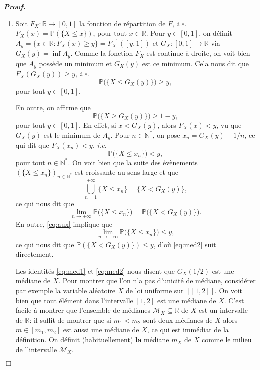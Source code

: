 \documentclass[11pt,a4paper]{article}
\newcommand{\NN}{\mathbb{N}}
\newcommand{\RR}{\mathbb{R}}
\newenvironment{preuve}[1][]
{\vskip 2mm  \noindent\emph{\bf Proof#1. }}{$\Box$ \vskip 2mm}
\let\geq\geqslant
\let\leq\leqslant
\begin{document}
		\begin{preuve}
			\begin{enumerate}
				\item Soit $F_{X} : \RR \rightarrow [0,1]$ la fonction de répartition de $F$, \textit{i.e.} $F_{X}(x) = \mathbb{P}(\{X \leq x\})$, pour tout $x \in \RR$. 
				Pour $y \in [0,1]$, on définit $A_{y} = \{ x \in \RR : F_{X}(x) \geq y \} = F_{X}^{-1}([y,1])$ et $G_{X} : [0,1] \rightarrow \RR$ 
				via $G_{X}(y) = \inf A_{y}$. 
				Comme la fonction $F_{X}$ est continue à droite, on voit bien que $A_{y}$ possède un minimum et $G_{X}(y)$ est ce minimum. 
				Cela nous dit que $F_{X}(G_{X}(y)) \geq y$, \textit{i.e.} 
				\begin{equation}
				\label{eq:med1}
				\mathbb{P}\big( \{ X \leq G_{X}(y) \} \big) \geq y,
				\end{equation}          
				pour tout $y \in [0,1]$. 
				
				En outre, on affirme que 
				\begin{equation}
				\label{eq:med2}
				\mathbb{P}\big( \{ X \geq G_{X}(y) \} \big) \geq 1-y,
				\end{equation}          
				pour tout $y \in [0,1]$. 
				En effet, si $x < G_{X}(y)$, alors $F_{X}(x) < y$, vu que $G_{X}(y)$ est le minimum de $A_{y}$. 
				Pour $n \in \NN^{*}$, on pose $x_{n} = G_{X}(y) - 1/n$, ce qui dit que $F_{X}(x_{n}) < y$, \textit{i.e.}
				\begin{equation}
				\label{eq:aux}
				\mathbb{P}\big( \{ X \leq x_{n} \} \big) < y,     
				\end{equation}   
				pour tout $n \in \NN^{*}$. 
				On voit bien que la suite des évènements $( \{ X \leq x_{n} \} )_{n \in \NN^{*}}$ est croissante au sens large et que
				\[     \bigcup_{n=1}^{+ \infty} \{ X \leq x_{n} \} = \{ X < G_{X}(y) \},     \]
				ce qui nous dit que 
				\[        \underset{n \rightarrow + \infty}{\lim} \mathbb{P}\big( \{ X \leq x_{n} \} \big) = \mathbb{P}\big( \{ X < G_{X}(y) \} \big).     \]
				En outre, \eqref{eq:aux} implique que  
				\[        \underset{n \rightarrow + \infty}{\lim} \mathbb{P}\big( \{ X \leq x_{n} \} \big) \leq y,     \]
				ce qui nous dit que $\mathbb{P}( \{ X < G_{X}(y) \}) \leq y$, d'où \eqref{eq:med2} suit directement. 
				
				Les identités \eqref{eq:med1} et \eqref{eq:med2} nous disent que $G_{X}(1/2)$ est une médiane de $X$. 
				Pour montrer que l'on n'a pas d'unicité de médiane, considérer par exemple la variable aléatoire $X$ de loi uniforme sur $[\![ 1, 2 ]\!]$. 
				On voit bien que tout élément dans l'intervalle $[1,2]$ est une médiane de $X$. 
				C'est facile à montrer que l'ensemble de médianes $\mathscr{M}_{X} \subseteq \RR$ de $X$ est un intervalle de $\RR$: 
				il suffit de montrer que si $m_{1} < m_{2}$ sont deux médianes de $X$ alors $m \in [m_{1},m_{2}]$ est aussi une médiane de $X$, ce qui est immédiat de la définition. 
				On définit (habituellement) \textbf{la} médiane $m_{X}$ de $X$ comme le milieu de l'intervalle $\mathscr{M}_{X}$. 
				

\end{enumerate}
\end{preuve}
\end{document}

